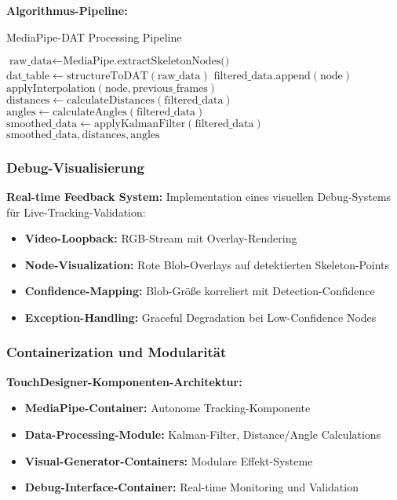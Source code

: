 \textbf{Algorithmus-Pipeline:}

\begin{algorithm}[H]
\caption{MediaPipe-DAT Processing Pipeline}\label{alg:mediapipe_dat}
\begin{algorithmic}[1]
    \State $\text{raw\_data} \leftarrow \text{MediaPipe.extractSkeletonNodes()}$
    \State $\text{dat\_table} \leftarrow \text{structureToDAT}(\text{raw\_data})$
            \State $\text{filtered\_data.append}(\text{node})$
        \Else
            \State $\text{applyInterpolation}(\text{node}, \text{previous\_frames})$
        \EndIf
    \EndFor
    \State $\text{distances} \leftarrow \text{calculateDistances}(\text{filtered\_data})$
    \State $\text{angles} \leftarrow \text{calculateAngles}(\text{filtered\_data})$
    \State $\text{smoothed\_data} \leftarrow \text{applyKalmanFilter}(\text{filtered\_data})$
    \Return $\text{smoothed\_data}, \text{distances}, \text{angles}$
\end{algorithmic}
\end{algorithm}

\subsubsection{Debug-Visualisierung}

\textbf{Real-time Feedback System:}
Implementation eines visuellen Debug-Systems für Live-Tracking-Validation:

\begin{itemize}
    \item \textbf{Video-Loopback:} RGB-Stream mit Overlay-Rendering
    \item \textbf{Node-Visualization:} Rote Blob-Overlays auf detektierten Skeleton-Points
    \item \textbf{Confidence-Mapping:} Blob-Größe korreliert mit Detection-Confidence
    \item \textbf{Exception-Handling:} Graceful Degradation bei Low-Confidence Nodes
\end{itemize}


\subsubsection{Containerization und Modularität}

\textbf{TouchDesigner-Komponenten-Architektur:}
\begin{itemize}
    \item \textbf{MediaPipe-Container:} Autonome Tracking-Komponente
    \item \textbf{Data-Processing-Module:} Kalman-Filter, Distance/Angle Calculations
    \item \textbf{Visual-Generator-Containers:} Modulare Effekt-Systeme
    \item \textbf{Debug-Interface-Container:} Real-time Monitoring und Validation
\end{itemize}

